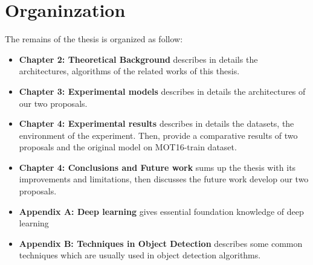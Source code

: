 \section{Organinzation}
The remains of the thesis is organized as follow:
\begin{itemize}[label={}]
  \item \textbf{Chapter 2: Theoretical Background} describes in details the architectures, algorithms of the related works of this thesis.
  \item \textbf{Chapter 3: Experimental models} describes in details the architectures of our two proposals.
  \item \textbf{Chapter 4: Experimental results} describes in details the datasets, the environment of the experiment. Then, provide a comparative results of two proposals and the original model on MOT16-train dataset.
  \item \textbf{Chapter 4: Conclusions and Future work} sums up the thesis with its improvements and limitations, then discusses the future work develop our two proposals.
  \item \textbf{Appendix A: Deep learning} gives essential foundation knowledge of deep learning
  \item \textbf{Appendix B: Techniques in Object Detection} describes some common techniques which are usually used in object detection algorithms.
\end{itemize}